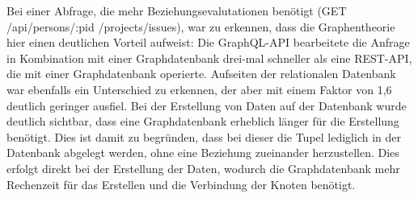 \newline
\noindent
Bei einer Abfrage, die mehr Beziehungsevalutationen benötigt  (GET /api/persons/:pid /projects/issues), war zu erkennen, dass die Graphentheorie hier einen deutlichen Vorteil aufweist: Die GraphQL-API bearbeitete die Anfrage in Kombination mit einer Graphdatenbank drei-mal schneller als eine REST-API, die mit einer Graphdatenbank operierte. Aufseiten der relationalen Datenbank war ebenfalls ein Unterschied zu erkennen, der aber mit einem Faktor von 1,6 deutlich geringer ausfiel.
\newline
\noindent
Bei der Erstellung von Daten auf der Datenbank wurde deutlich sichtbar, dass eine Graphdatenbank erheblich länger für die Erstellung benötigt. Dies ist damit zu begründen, dass bei dieser die Tupel lediglich in der Datenbank abgelegt werden, ohne eine Beziehung zueinander herzustellen. Dies erfolgt direkt bei der Erstellung der Daten, wodurch die Graphdatenbank mehr Rechenzeit für das Erstellen und die Verbindung der Knoten benötigt.  \citep{constantinov2015running}

